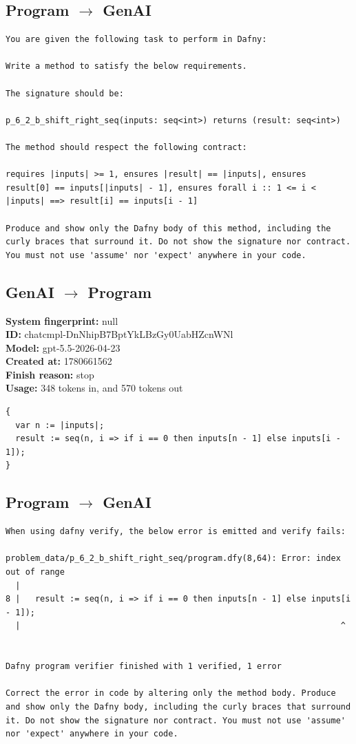 \documentclass{article}
\begin{document}
\subsection*{Program $\rightarrow$ GenAI}
\begin{lstlisting}
You are given the following task to perform in Dafny:

Write a method to satisfy the below requirements.

The signature should be:

p_6_2_b_shift_right_seq(inputs: seq<int>) returns (result: seq<int>)

The method should respect the following contract:

requires |inputs| >= 1, ensures |result| == |inputs|, ensures result[0] == inputs[|inputs| - 1], ensures forall i :: 1 <= i < |inputs| ==> result[i] == inputs[i - 1]

Produce and show only the Dafny body of this method, including the curly braces that surround it. Do not show the signature nor contract. You must not use 'assume' nor 'expect' anywhere in your code.
\end{lstlisting}
\subsection*{GenAI $\rightarrow$ Program}
\textbf{System fingerprint: }null
\\\textbf{ID: }chatcmpl-DnNhipB7BptYkLBzGy0UabHZcnWNl
\\\textbf{Model: }gpt-5.5-2026-04-23
\\\textbf{Created at: }1780661562
\\\textbf{Finish reason: }stop
\\\textbf{Usage: }348 tokens in, and 570 tokens out
\begin{lstlisting}
{
  var n := |inputs|;
  result := seq(n, i => if i == 0 then inputs[n - 1] else inputs[i - 1]);
}
\end{lstlisting}
\subsection*{Program $\rightarrow$ GenAI}
\begin{lstlisting}
When using dafny verify, the below error is emitted and verify fails:

problem_data/p_6_2_b_shift_right_seq/program.dfy(8,64): Error: index out of range
  |
8 |   result := seq(n, i => if i == 0 then inputs[n - 1] else inputs[i - 1]);
  |                                                                 ^


Dafny program verifier finished with 1 verified, 1 error

Correct the error in code by altering only the method body. Produce and show only the Dafny body, including the curly braces that surround it. Do not show the signature nor contract. You must not use 'assume' nor 'expect' anywhere in your code.
\end{lstlisting}
\end{document}
